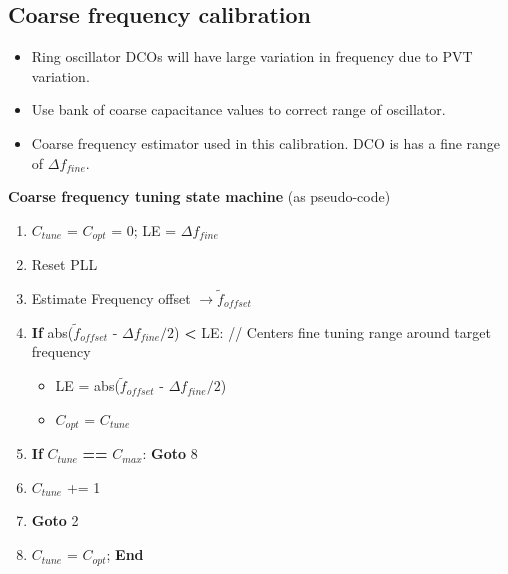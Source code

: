 \documentclass[10pt,a4paper]{article}
\begin{document}
		\flushleft
		\subsection{Coarse frequency calibration}
		\begin{itemize}
			\vspace{-0.25em}
			\scriptsize
			\item Ring oscillator DCOs will have large variation in frequency due to PVT variation.
			\item Use bank of coarse capacitance values to correct range of oscillator.
			\item Coarse frequency estimator used in this calibration.  DCO is has a fine range of $\Delta f_{fine}$.
		\end{itemize} 	
		\vspace{-0.25em}
		\scriptsize
		\textbf{Coarse frequency tuning state machine} (as pseudo-code)
			\begin{enumerate}
				\scriptsize
				\item $C_{tune}$ = $C_{opt}$ = 0;\hspace{1em} LE = $\Delta f_{fine}$		
				\item Reset PLL
				\item Estimate Frequency offset $\rightarrow \tilde f_{offset}$
				\vspace{-0.2em}
				\item \textbf{If} abs($\tilde f_{offset}$ - $\Delta f_{fine}/2$)  \textbf{<} LE: \hspace{1em}\color{teal} // Centers fine tuning range around target frequency
				\color{black}
				\begin{itemize}
					\scriptsize
					\item LE = abs($\tilde f_{offset}$ - $\Delta f_{fine}/2$)
					\item $C_{opt}$ = $C_{tune}$
				\end{itemize}	
				\item \textbf{If} $C_{tune}$ \textbf{==} $C_{max}$: \textbf{Goto} 8		
				\item $C_{tune}$ += 1
				\item \textbf{Goto} 2
				\item $C_{tune}$ = $C_{opt}$; \textbf{End}
			\end{enumerate}
 
\end{document}
